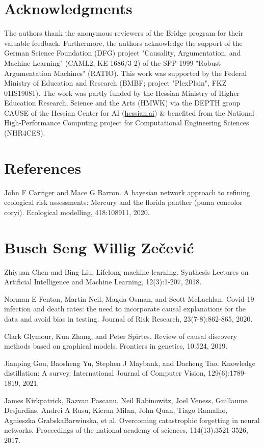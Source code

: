 \documentclass[10pt]{article}
\begin{document}
\section*{Acknowledgments}
The authors thank the anonymous reviewers of the Bridge program for their valuable feedback. Furthermore, the authors acknowledge the support of the German Science Foundation (DFG) project "Causality, Argumentation, and Machine Learning" (CAML2, KE 1686/3-2) of the SPP 1999 "Robust Argumentation Machines" (RATIO). This work was supported by the Federal Ministry of Education and Research (BMBF; project "PlexPlain", FKZ 01IS19081). The work was partly funded by the Hessian Ministry of Higher Education Research, Science and the Arts (HMWK) via the DEPTH group CAUSE of the Hessian Center for AI (\href{http://hessian.ai}{hessian.ai}) \& benefited from the National High-Performance Computing project for Computational Engineering Sciences (NHR4CES).

\section*{References}
John F Carriger and Mace G Barron. A bayesian network approach to refining ecological risk assessments: Mercury and the florida panther (puma concolor coryi). Ecological modelling, 418:108911, 2020.

\section*{Busch Seng Willig Zečević}
Zhiyuan Chen and Bing Liu. Lifelong machine learning. Synthesis Lectures on Artificial Intelligence and Machine Learning, 12(3):1-207, 2018.

Norman E Fenton, Martin Neil, Magda Osman, and Scott McLachlan. Covid-19 infection and death rates: the need to incorporate causal explanations for the data and avoid bias in testing. Journal of Risk Research, 23(7-8):862-865, 2020.

Clark Glymour, Kun Zhang, and Peter Spirtes. Review of causal discovery methods based on graphical models. Frontiers in genetics, 10:524, 2019.

Jianping Gou, Baosheng Yu, Stephen J Maybank, and Dacheng Tao. Knowledge distillation: A survey. International Journal of Computer Vision, 129(6):1789-1819, 2021.

James Kirkpatrick, Razvan Pascanu, Neil Rabinowitz, Joel Veness, Guillaume Desjardins, Andrei A Rusu, Kieran Milan, John Quan, Tiago Ramalho, Agnieszka GrabskaBarwinska, et al. Overcoming catastrophic forgetting in neural networks. Proceedings of the national academy of sciences, 114(13):3521-3526, 2017.
\end{document}

